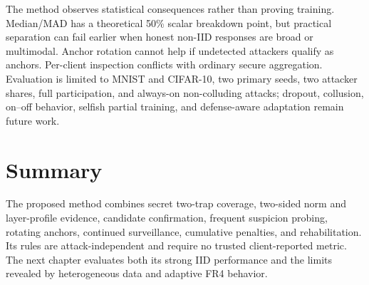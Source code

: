 The method observes statistical consequences rather than proving training. Median/MAD has a theoretical 50\% scalar breakdown point, but practical separation can fail earlier when honest non-IID responses are broad or multimodal. Anchor rotation cannot help if undetected attackers qualify as anchors. Per-client inspection conflicts with ordinary secure aggregation. Evaluation is limited to MNIST and CIFAR-10, two primary seeds, two attacker shares, full participation, and always-on non-colluding attacks; dropout, collusion, on--off behavior, selfish partial training, and defense-aware adaptation remain future work.

\section{Summary}

The proposed method combines secret two-trap coverage, two-sided norm and layer-profile evidence, candidate confirmation, frequent suspicion probing, rotating anchors, continued surveillance, cumulative penalties, and rehabilitation. Its rules are attack-independent and require no trusted client-reported metric. The next chapter evaluates both its strong IID performance and the limits revealed by heterogeneous data and adaptive FR4 behavior.
